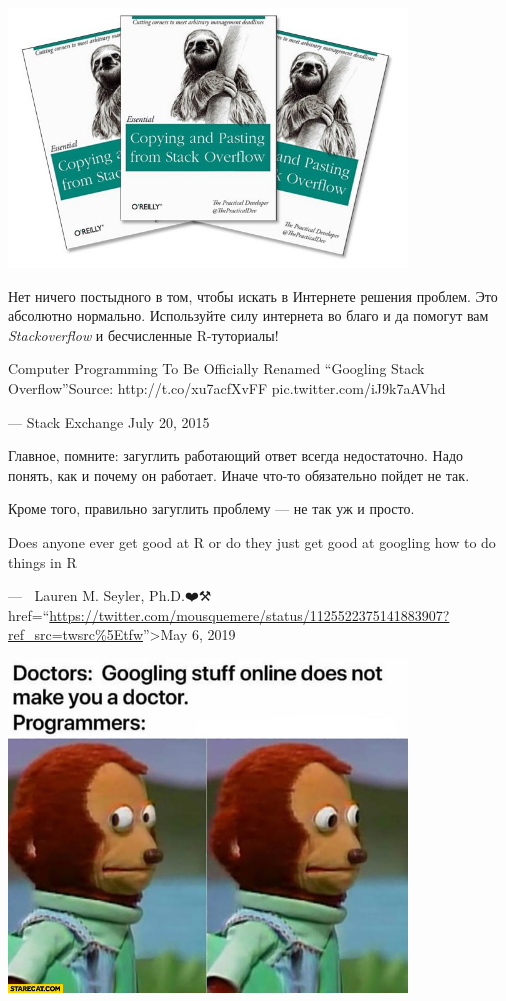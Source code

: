 \documentclass[
]{book}
\begin{document}
\includegraphics[width=4.16667in,height=\textheight]{images/2AmXWgVoULk.jpg}

Нет ничего постыдного в том, чтобы искать в Интернете решения проблем. Это абсолютно нормально. Используйте силу интернета во благо и да помогут вам \emph{Stackoverflow} и бесчисленные R-туториалы!

Computer Programming To Be Officially Renamed ``Googling Stack Overflow''Source: http://t.co/xu7acfXvFF pic.twitter.com/iJ9k7aAVhd

--- Stack Exchange July 20, 2015

Главное, помните: загуглить работающий ответ всегда недостаточно. Надо понять, как и почему он работает. Иначе что-то обязательно пойдет не так.

Кроме того, правильно загуглить проблему --- не так уж и просто.

Does anyone ever get good at R or do they just get good at googling how to do things in R

--- 🔬🖤Lauren M. Seyler, Ph.D.❤️⚒ href=``\url{https://twitter.com/mousquemere/status/1125522375141883907?ref_src=twsrc\%5Etfw}''\textgreater May 6, 2019

\includegraphics[width=4.16667in,height=\textheight]{images/doctors-googling-stuff-online-does-not-make-you-a-doctor-programmers-confused.jpg}
\end{document}
